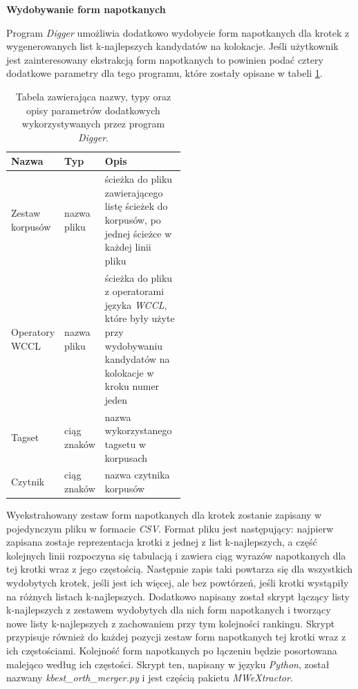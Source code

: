 \par
\noindent\textbf{Wydobywanie form napotkanych}
\par
Program \emph{Digger} umożliwia dodatkowo wydobycie form napotkanych dla krotek z wygenerowanych list k-najlepszych kandydatów na kolokacje.
Jeśli użytkownik jest zainteresowany ekstrakcją form napotkanych to powinien podać cztery dodatkowe parametry dla tego programu, które zostały opisane w tabeli \ref{digger_parameters_orths}.

\begin{table}[h!]
\centering
\begin{tabular}{l | l | p{0.5\linewidth}}
	\toprule 
	\textbf{Nazwa} & \textbf{Typ} & \textbf{Opis} \\
	\midrule 
	Zestaw korpusów & nazwa pliku & ścieżka do pliku zawierającego listę ścieżek do korpusów, po jednej ścieżce w każdej linii pliku \\ 
	\hline
	Operatory WCCL & nazwa pliku & ścieżka do pliku z operatorami języka \emph{WCCL}, które były użyte przy wydobywaniu kandydatów na kolokacje w kroku numer jeden\\ 
	\hline
	Tagset & ciąg znaków & nazwa wykorzystanego tagsetu w korpusach \\
	\hline
	Czytnik & ciąg znaków & nazwa czytnika korpusów\\
	\bottomrule
\end{tabular}
\caption[Parametery dodatkowe programu \emph{Digger}]{Tabela zawierająca nazwy, typy oraz opisy parametrów dodatkowych wykorzystywanych przez program \emph{Digger}.}
\label{digger_parameters_orths}
\end{table}

Wyekstrahowany zestaw form napotkanych dla krotek zostanie zapisany w pojedynczym pliku w formacie \emph{CSV}.
Format pliku jest następujący: najpierw zapisana zostaje reprezentacja krotki z jednej z list k-najlepszych, a część kolejnych linii rozpoczyna się tabulacją i zawiera ciąg wyrazów napotkanych dla tej krotki wraz z jego częstością.
Następnie zapis taki powtarza się dla wszystkich wydobytych krotek, jeśli jest ich więcej, ale bez powtórzeń, jeśli krotki wystąpiły na różnych listach k-najlepszych.
Dodatkowo napisany został skrypt łączący listy k-najlepszych z zestawem wydobytych dla nich form napotkanych i tworzący nowe listy k-najlepszych z zachowaniem przy tym kolejności rankingu.
Skrypt przypisuje również do każdej pozycji zestaw form napotkanych tej krotki wraz z ich częstościami.
Kolejność form napotkanych po łączeniu będzie posortowana malejąco według ich częstości.
Skrypt ten, napisany w języku \emph{Python}, został nazwany \emph{kbest\_orth\_merger.py} i jest częścią pakietu \emph{MWeXtractor}.


